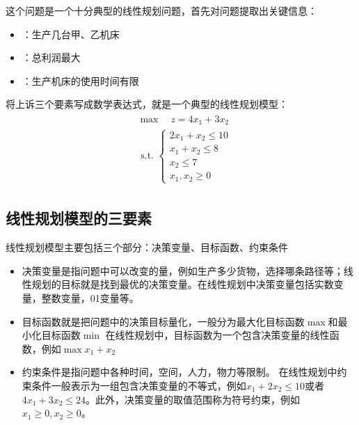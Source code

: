 \documentclass[letterpaper,10pt,english]{sphinxmanual}
\begin{document}
这个问题是一个十分典型的线性规划问题，首先对问题提取出关键信息：
\begin{itemize}
\item {} 
：生产几台甲、乙机床

\item {} 
：总利润最大

\item {} 
：生产机床的使用时间有限

\end{itemize}

将上诉三个要素写成数学表达式，就是一个典型的线性规划模型：
\begin{equation*}
\begin{split}
\begin{aligned}
&\max \quad z= 4x_{1}+ 3x_{2}\\
&\text { s.t. }\left\{\begin{array}{l}
{2x_{1}+ x_{2} \leq 10} \\
{x_{1}+ x_{2} \leq 8} \\
{x_2  \leq 7}\\
{ x_{1}, x_{2} \geq 0}
\end{array}\right.
\end{aligned}
\end{split}
\end{equation*}

\subsection{线性规划模型的三要素}
\label{\detokenize{docs/LP:id4}}
线性规划模型主要包括三个部分：决策变量、目标函数、约束条件
\begin{itemize}
\item {} 
决策变量是指问题中可以改变的量，例如生产多少货物，选择哪条路径等；线性规划的目标就是找到最优的决策变量。在线性规划中决策变量包括实数变量，整数变量，0\sphinxhyphen{}1变量等。

\item {} 
目标函数就是把问题中的决策目标量化，一般分为最大化目标函数\(\max\)和最小化目标函数\(\min\)
在线性规划中，目标函数为一个包含决策变量的线性函数，例如\(\max x_1 + x_2\)

\item {} 
约束条件是指问题中各种时间，空间，人力，物力等限制。
在线性规划中约束条件一般表示为一组包含决策变量的不等式，例如\(x_1 + 2x_2 \leq 10 \)或者\(4x_1 + 3x_2 \leq 24\)。此外，决策变量的取值范围称为符号约束，例如\(x_1 \geq 0, x_2 \geq 0\)。

\end{itemize}
\end{document}
